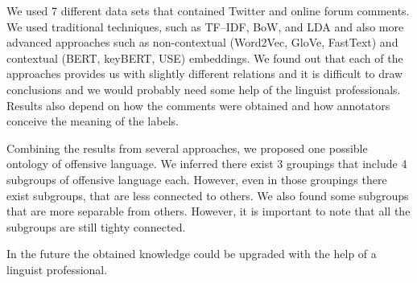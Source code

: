 \documentclass[fleqn,moreauthors,10pt]{ds_report}
\begin{document}
We used 7 different data sets that contained Twitter and online forum comments. We used traditional techniques, such as TF--IDF, BoW, and LDA and also more advanced approaches such as non-contextual (Word2Vec, GloVe, FastText) and contextual (BERT, keyBERT, USE) embeddings. We found out that each of the approaches provides us with slightly different relations and it is difficult to draw conclusions and we would probably need some help of the linguist professionals. Results also depend on how the comments were obtained and how annotators conceive the meaning of the labels. 

Combining the results from several approaches, we proposed one possible ontology of offensive language.
We inferred there exist 3 groupings that include 4 subgroups of offensive language each. However, even in those groupings there exist subgroups, that are less connected to others. We also found some subgroups that are more separable from others. However, it is important to note that all the subgroups are still tighty connected.

In the future the obtained knowledge could be upgraded with the help of a linguist professional.



\end{document}
